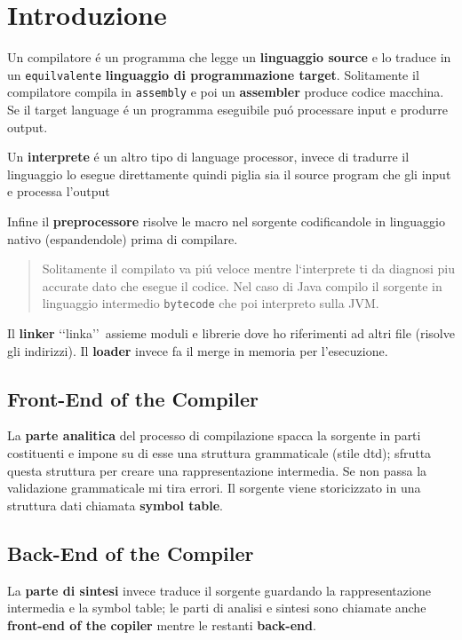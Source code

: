 \chapter{Introduzione}
Un compilatore \'e un programma che legge un \textbf{linguaggio source} e lo traduce in un \texttt{equilvalente} \textbf{linguaggio di programmazione
target}. 
Solitamente il compilatore compila in \texttt{assembly} e poi un \textbf{assembler} produce codice macchina.
Se il target language \'e un programma eseguibile pu\'o processare input e produrre output.

Un \textbf{interprete} \'e un altro tipo di language processor, invece di tradurre il linguaggio lo esegue direttamente
quindi piglia sia il source program che gli input e processa l'output

Infine il \textbf{preprocessore} risolve le macro nel sorgente codificandole in linguaggio nativo (espandendole) prima di compilare.

\begin{quote}
Solitamente il compilato va pi\'u veloce mentre l`interprete ti da diagnosi piu accurate dato che esegue il codice.
Nel caso di Java compilo il sorgente in linguaggio intermedio \texttt{bytecode} che poi interpreto sulla JVM.
\end{quote}

Il \textbf{linker} \lq\lq linka\rq\rq\ assieme moduli e librerie dove ho riferimenti ad altri file (risolve gli indirizzi).
Il \textbf{loader} invece fa il merge in memoria per l'esecuzione.


\section{Front-End of the Compiler}
La \textbf{parte analitica} del processo di compilazione spacca la sorgente in parti costituenti e impone su di esse una struttura 
grammaticale (stile dtd); sfrutta questa struttura per creare una rappresentazione intermedia.
Se non passa la validazione grammaticale mi tira errori. Il sorgente viene storicizzato in
una struttura dati chiamata \textbf{symbol table}. 

\section{Back-End of the Compiler}
La \textbf{parte di sintesi} invece traduce il sorgente guardando la rappresentazione intermedia e la symbol table;
le parti di analisi e sintesi sono chiamate anche \textbf{front-end of the copiler} mentre le restanti \textbf{back-end}.


